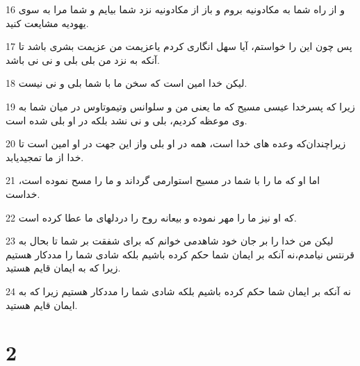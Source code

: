 \par 16 و از راه شما به مکادونیه بروم و باز از مکادونیه نزد شما بیایم و شما مرا به سوی یهودیه مشایعت کنید.
\par 17 پس چون این را خواستم، آیا سهل انگاری کردم یاعزیمت من عزیمت بشری باشد تا آنکه به نزد من بلی بلی و نی نی باشد.
\par 18 لیکن خدا امین است که سخن ما با شما بلی و نی نیست.
\par 19 زیرا که پسرخدا عیسی مسیح که ما یعنی من و سلوانس وتیموتاوس در میان شما به وی موعظه کردیم، بلی و نی نشد بلکه در او بلی شده است.
\par 20 زیراچندان‌که وعده های خدا است، همه در او بلی واز این جهت در او امین است تا خدا از ما تمجیدیابد.
\par 21 اما او که ما را با شما در مسیح استوارمی گرداند و ما را مسح نموده است، خداست.
\par 22 که او نیز ما را مهر نموده و بیعانه روح را دردلهای ما عطا کرده است.
\par 23 لیکن من خدا را بر جان خود شاهدمی خوانم که برای شفقت بر شما تا بحال به قرنتس نیامدم،نه آنکه بر ایمان شما حکم کرده باشیم بلکه شادی شما را مددکار هستیم زیرا که به ایمان قایم هستید.
\par 24 نه آنکه بر ایمان شما حکم کرده باشیم بلکه شادی شما را مددکار هستیم زیرا که به ایمان قایم هستید.

\chapter{2}

